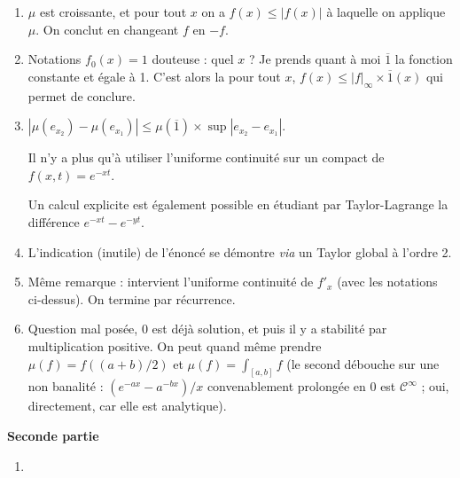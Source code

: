 \documentclass[a4paper]{article}
\begin{document}
\begin{enumerate}
\begin{enumerate}
	R\'ecurrence. Cela ne s'\'etend pas en $b$ : $e^x$ en $\infty$ par
exemple.

\item

	$\mu$ est croissante, et pour tout $x$ on a $f(x)\le |f(x)|$ \`a
laquelle on applique $\mu$. On conclut en changeant $f$ en $-f$.

\item

	Notations $f_0(x)=1$ douteuse : quel $x$ ? Je prends quant \`a moi
$\overline{1}$ la fonction constante et \'egale \`a 1. C'est alors la
pour tout $x$, $f(x)\le |f|_{\infty}\times \overline{1}(x)$ qui
permet de conclure.

\item

$|\mu(e_{x_2})-\mu(e_{x_1})|\le\mu(\overline{1})\times
\sup|e_{x_2}-e_{x_1}|$. 

	Il n'y a plus qu'\`a utiliser l'uniforme continuit\'e sur un compact
de $f(x,t)=e^{-xt}$.

Un calcul explicite est \'egalement possible en \'etudiant par
Taylor-Lagrange la diff\'erence $e^{-xt}-e^{-yt}$.

\item

	L'indication (inutile) de l'\'enonc\'e se d\'emontre \emph{via} un Taylor global
\`a l'ordre 2. 

\item

	M\^eme remarque : intervient l'uniforme continuit\'e de $f'_x$ (avec
les notations ci-dessus). On termine par r\'ecurrence.

\item

	Question mal pos\'ee, 0 est d\'ej\`a solution, et puis il y a stabilit\'e
par multiplication positive. On peut quand m\^eme prendre
$\mu(f)=f((a+b)/2)$ et $\mu(f)=\int_{[a,b]} f$ (le second d\'ebouche sur
une non banalit\'e : $(e^{-ax}-a^{-bx})/x$ convenablement prolong\'ee en 0
est $\mathcal{C}^\infty$ ; oui, directement, car elle est analytique).

\end{enumerate}

\vspace*{3em}
\centerline{\textbf{\Large Seconde partie}}
\begin{enumerate}
\item


\end{enumerate}
\end{enumerate}
\end{document}
